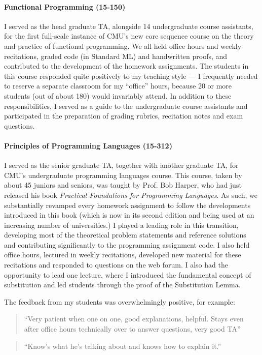 \documentclass[9pt]{extarticle}
\begin{document}
\paragraph{Functional Programming (15-150)} I served as the head graduate TA, alongside 14 undergraduate course assistants, for the first full-scale instance of CMU's new core sequence course on the theory and practice of functional programming. We all held office hours and weekly recitations, graded code (in Standard ML) and handwritten proofs, and contributed to the development of the homework assignments. The students in this course responded quite positively to my teaching style --- I frequently needed to reserve a separate classroom for my ``office'' hours, because 20 or more students (out of about 180) would invariably attend. In addition to these responsibilities, I served as a guide to the undergraduate course assistants and participated in the preparation of grading rubrics, recitation notes and exam questions.  

\paragraph{Principles of Programming Languages (15-312)} I served as the senior graduate TA, together with another graduate TA, for CMU's undergraduate programming languages course. This course, taken by about 45 juniors and seniors, was taught by Prof. Bob Harper, who had just released his book \emph{Practical Foundations for Programming Languages}. As such, we substantially revamped every homework assignment to follow the developments introduced in this book (which is now in its second edition and being used at an increasing number of universities.) I played a leading role in this transition, developing most of the theoretical problem statements and reference solutions and contributing significantly to the programming assignment code. I also held office hours, lectured in weekly recitations, developed new material for these recitations and responded to questions on the web forum. I also had the opportunity to lead one lecture, where I introduced the fundamental concept of {substitution} and led students through the proof of the Substitution Lemma. 

The feedback from my students was overwhelmingly positive, for example:

\begin{quote}
``Very patient when one on one, good explanations, helpful. Stays even after office hours technically over to answer questions, very good TA''
\end{quote}
\begin{quote}
``Know's what he's talking about and knows how to explain it.''
\end{quote}
\end{document}
